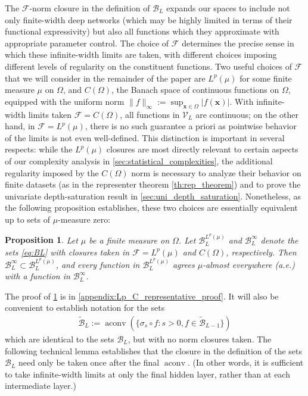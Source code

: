 \documentclass{article}
\DeclareMathOperator{\aconv}{\mathrm{aconv}}
\def\vx{{\bm{x}}}
\def\cB{{\mathcal{B}}}
\def\cF{{\mathcal{F}}}
\def\cV{{\mathcal{V}}}
\newtheorem{proposition}[theorem]{Proposition}
\begin{document}
The $\cF$-norm closure in the definition of $\cB_L$ expands our spaces to include not only finite-width deep networks (which may be highly limited in terms of their functional expressivity) but also all functions which they approximate with appropriate parameter control. The choice of $\cF$ determines the precise sense in which these infinite-width limits are taken, with different choices imposing different levels of regularity on the constituent functions. Two useful choices of $\cF$ that we will consider in the remainder of the paper are $L^p(\mu)$ for some finite measure $\mu$ on $\Omega$, and $C(\Omega)$, the Banach space of continuous functions on $\Omega$, equipped with the uniform norm $\| f \|_\infty := \sup_{\vx \in \Omega} |f(\vx)|$. With infinite-width limits taken $\cF = C(\Omega)$, all functions in $\cV_L$ are continuous; on the other hand, in $\cF = L^p(\mu)$, there is no such guarantee a priori as pointwise behavior of the limits is not even well-defined. This distinction is important in several respects: while the $L^p(\mu)$ closures are most directly relevant to certain aspects of our complexity analysis in \cref{sec:statistical_complexities}, the additional regularity imposed by the $C(\Omega)$ norm is necessary to analyze their behavior on finite datasets (as in the representer theorem \cref{th:rep_theorem}) and to prove the univariate depth-saturation result in \cref{sec:uni_depth_saturation}. Nonetheless, as the following proposition establishes, these two choices are essentially equivalent up to sets of $\mu$-measure zero:
 \begin{proposition} \label{prop:Lp_C_representative}
    Let $\mu$ be a finite measure on $\Omega$. Let $\cB_L^{L^p(\mu)}$ and $\cB_L^{\infty}$ denote the sets \eqref{eq:BL} with closures taken in $\cF = L^p(\mu)$ and $C(\Omega)$, respectively. Then $\cB_L^{\infty} \subset \cB_L^{L^p(\mu)}$, and every function in $\cB_L^{L^p(\mu)}$ agrees $\mu$-almost everywhere (a.e.) with a function in $\cB_L^{\infty}$. 
\end{proposition}
The proof of \cref{prop:Lp_C_representative} is in \cref{appendix:Lp_C_representative_proof}. It will also be convenient to establish notation for the sets
\begin{align} \label{eq:B_tilde}
    \widetilde{\cB}_L := \aconv \left( \{ \sigma_s \circ f: s > 0, f \in \widetilde{\cB}_{L-1} \} \right)
\end{align}
which are identical to the sets $\cB_L$, but with no norm closures taken. The following technical lemma establishes that the closure in the definition of the sets $\cB_L$ need only be taken once after the final $\aconv$. (In other words, it is sufficient to take infinite-width limits at only the final hidden layer, rather than at each intermediate layer.)
\end{document}
